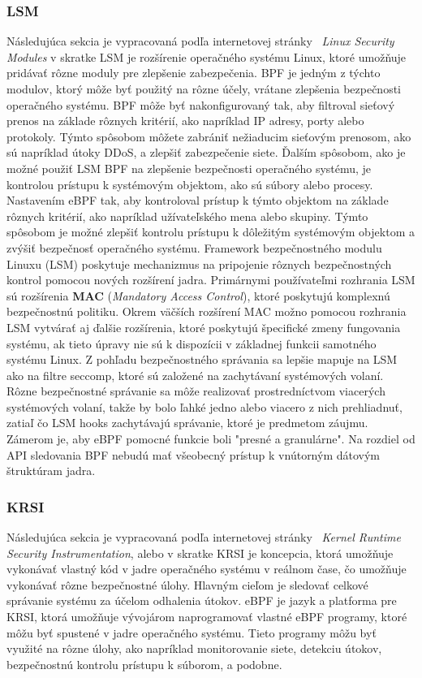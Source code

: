 \subsubsection{LSM}
Následujúca sekcia je vypracovaná podľa internetovej stránky~\cite{lsm,lsm-usage}
\emph{Linux Security Modules} v skratke LSM je rozšírenie operačného systému Linux, ktoré umožňuje pridávať rôzne moduly pre zlepšenie zabezpečenia. 
BPF je jedným z týchto modulov, ktorý môže byť použitý na rôzne účely, vrátane zlepšenia bezpečnosti operačného systému. BPF môže byť nakonfigurovaný tak, 
aby filtroval sieťový prenos na základe rôznych kritérií, ako napríklad IP adresy, porty alebo protokoly. Týmto spôsobom môžete zabrániť 
nežiaducim sieťovým prenosom, ako sú napríklad útoky DDoS, a zlepšiť zabezpečenie siete. Ďalším spôsobom, ako je možné použiť LSM BPF 
na zlepšenie bezpečnosti operačného systému, je kontrolou prístupu k systémovým objektom, ako sú súbory alebo procesy. Nastavením eBPF tak, 
aby kontroloval prístup k týmto objektom na základe rôznych kritérií, ako napríklad užívateľského mena alebo skupiny. Týmto spôsobom je možné 
zlepšiť kontrolu prístupu k dôležitým systémovým objektom a zvýšiť bezpečnosť operačného systému. Framework bezpečnostného modulu Linuxu (LSM) 
poskytuje mechanizmus na pripojenie rôznych bezpečnostných kontrol pomocou nových rozšírení jadra. Primárnymi používateľmi rozhrania LSM 
sú rozšírenia \textbf{MAC} (\emph{Mandatory Access Control}), ktoré poskytujú komplexnú bezpečnostnú politiku. Okrem väčších rozšírení MAC možno pomocou 
rozhrania LSM vytvárať aj ďalšie rozšírenia, ktoré poskytujú špecifické zmeny fungovania systému, ak tieto úpravy nie sú k dispozícii 
v základnej funkcii samotného systému Linux. Z pohľadu bezpečnostného správania sa lepšie mapuje na LSM ako na filtre seccomp, 
ktoré sú založené na zachytávaní systémových volaní. Rôzne bezpečnostné správanie sa môže realizovať prostredníctvom viacerých systémových volaní, 
takže by bolo ľahké jedno alebo viacero z nich prehliadnuť, zatiaľ čo LSM hooks zachytávajú správanie, ktoré je predmetom záujmu. 
Zámerom je, aby eBPF pomocné funkcie boli "presné a granulárne". Na rozdiel od API sledovania BPF nebudú mať všeobecný prístup k vnútorným dátovým štruktúram jadra. 

\subsubsection{KRSI}
Následujúca sekcia je vypracovaná podľa internetovej stránky~\cite{krsi,krsi-sm}
\emph{Kernel Runtime Security Instrumentation}, alebo v skratke KRSI je koncepcia, ktorá umožňuje vykonávať vlastný kód v jadre operačného systému v reálnom čase, 
čo umožňuje vykonávať rôzne bezpečnostné úlohy. Hlavným cieľom je sledovať celkové správanie systému za účelom odhalenia útokov.  
eBPF je jazyk a platforma pre KRSI, ktorá umožňuje vývojárom naprogramovať vlastné eBPF programy, ktoré môžu byť spustené v jadre operačného systému. 
Tieto programy môžu byť využité na rôzne úlohy, ako napríklad monitorovanie siete, detekciu útokov, bezpečnostnú kontrolu prístupu k súborom, a podobne. 
